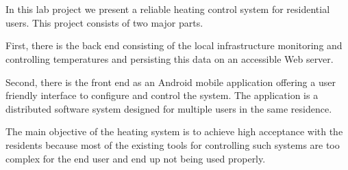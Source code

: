 
\chapter*{\abstractname}
\label{chap:abstract}

In this lab project we present a reliable heating control system for residential users.
This project consists of two major parts.

First, there is the back end consisting of the local infrastructure monitoring and controlling temperatures and persisting this data on an accessible Web server.

Second, there is the front end as an Android mobile application offering a user friendly interface to configure and control the system.
The application is a distributed software system designed for multiple users in the same residence.

The main objective of the heating system is to achieve high acceptance with the residents because most of the existing tools for controlling such systems are too complex for the end user and end up not being used properly.